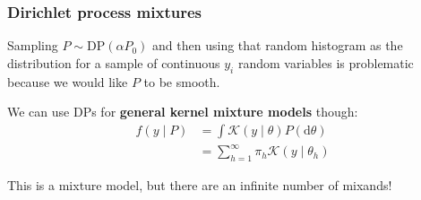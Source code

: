\documentclass{beamer}
\begin{document}
\begin{frame}
\frametitle{Dirichlet process mixtures}

Sampling $P \sim \text{DP}(\alpha P_0)$ and then using that random histogram as the distribution for a sample of continuous $y_i$ random variables is problematic because we would like $P$ to be smooth. 
\newline
\pause

We can use DPs for {\bf general kernel mixture models} though:
\begin{align*}
f(y \mid P) &= \int \mathcal{K}(y \mid \theta) P( \text{d} \theta) \\
&= \sum_{h=1}^{\infty} \pi_h \mathcal{K}(y \mid \theta_h)
\end{align*}

This is a mixture model, but there are an infinite number of mixands!

\end{frame}
\end{document}
